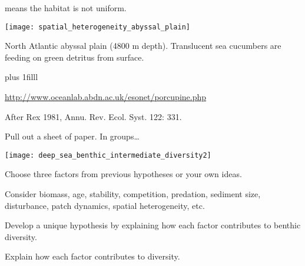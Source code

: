 \documentclass[t]{beamer}
\begin{document}
\begin{frame}[t]{ means the habitat is not uniform.}

	{\centering
	\texttt{[image: spatial\_heterogeneity\_abyssal\_plain]}\par}

	\vspace*{-\baselineskip}\hangpara North Atlantic abyssal plain (4800 m depth). Translucent sea cucumbers are feeding on green detritus from surface.

\vskip0pt plus 1filll

\hfill\tiny\url{http://www.oceanlab.abdn.ac.uk/esonet/porcupine.php}
\end{frame}


{
\begin{frame}[b]

\hfill\tiny After Rex 1981, Annu. Rev. Ecol. Syst. 122: 331.
\end{frame}}



%
%
%	
%
%

\begin{frame}[t]{Pull out a sheet of paper. In groups\dots}

	\vspace*{-\baselineskip}

	\begin{multicols}{2}

	\texttt{[image: deep\_sea\_benthic\_intermediate\_diversity2]}

	\columnbreak
	
	\hangpara Choose three factors from previous hypotheses or your own ideas.
	
	\hangpara Consider biomass, age, stability, competition, predation, sediment size, disturbance, patch dynamics, spatial heterogeneity, etc.

	\hangpara Develop a unique hypothesis by explaining how each factor contributes to benthic diversity. 
	
	\hangpara Explain how each factor contributes to diversity. 

	\end{multicols}

\end{frame}
\end{document}
